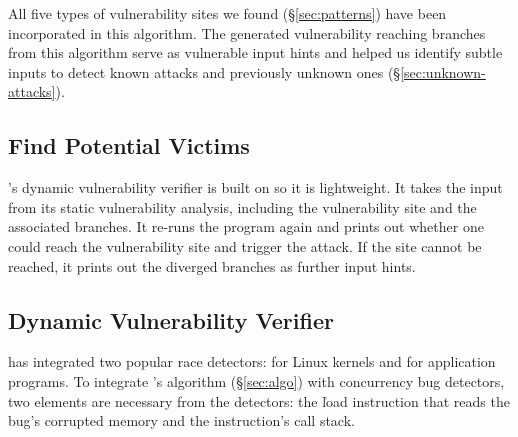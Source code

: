
All five types of vulnerability sites we found (\S\ref{sec:patterns}) have
been incorporated in this algorithm. The generated vulnerability reaching branches
from this algorithm serve as vulnerable input hints and helped us identify
subtle inputs to detect \nknownVul known attacks and \nunknownVul previously
unknown ones (\S\ref{sec:unknown-attacks}).

\subsection{Find Potential Victims}

\xxx's dynamic vulnerability verifier is built on \lldb so it is lightweight. 
It takes the input from its static vulnerability analysis, including the 
vulnerability site and the associated branches. It re-runs the program  again 
and prints out whether one could reach the vulnerability site and trigger the 
attack. If the site cannot be reached, it prints out the diverged branches as 
further input hints.


\subsection{Dynamic Vulnerability Verifier}

\xxx has integrated two popular race detectors: \ski for
Linux kernels and \tsan for application programs. To integrate \xxx's
algorithm (\S\ref{sec:algo}) with concurrency bug detectors, two 
elements are necessary from the detectors: the \v{load} instruction that reads 
the bug's corrupted memory and the instruction's call stack.

